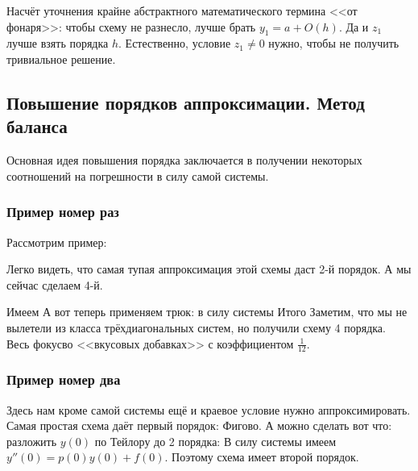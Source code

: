 \documentclass[a4paper]{article}
\begin{document}
\begin{note}
Насчёт уточнения крайне абстрактного математического термина <<от фонаря>>: чтобы схему не разнесло, лучше брать $y_1 = a + O(h)$.
Да и $z_1$ лучше взять порядка $h$. Естественно, условие $z_1\neq 0$ нужно, чтобы не получить тривиальное решение.
\end{note}

\subsection{Повышение порядков аппроксимации. Метод баланса}

Основная идея повышения порядка заключается в получении некоторых соотношений на погрешности в силу самой системы.

\subsubsection{Пример номер раз}

Рассмотрим пример:

Легко видеть, что самая тупая аппроксимация этой схемы даст 2-й порядок. А мы сейчас сделаем 4-й.

Имеем
А вот теперь применяем трюк: в силу системы
Итого
Заметим, что мы не вылетели из класса трёхдиагональных систем, но получили схему 4 порядка.
Весь фокус\т во <<вкусовых добавках>> с коэффициентом $\frac{1}{12}$.

\subsubsection{Пример номер два}


Здесь нам кроме самой системы ещё и краевое условие нужно аппроксимировать.
Самая простая схема даёт первый порядок:
Фигово. А можно сделать вот что: разложить $y(0)$ по Тейлору до 2 порядка:
В силу системы имеем $y''(0) = p(0) y(0) + f(0)$.
Поэтому схема
имеет второй порядок.
\end{document}
